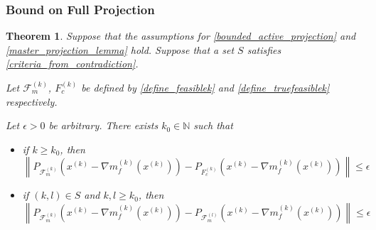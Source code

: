 \documentclass{article}
\newtheorem{theorem}{Theorem}[section]
\theoremstyle{case}
\numberwithin{theorem}{subsection}
\newcommand{\feasiblek}{{\mathcal F_m^{(k)}}}
\newcommand{\feasiblel}{{\mathcal F_m^{(l)}}}
\newcommand{\gk}{{\nabla m_f^{(k)}\left(\xk\right)}}
\newcommand{\naturals}{\mathbb N}
\newcommand{\xk}{x^{(k)}}
\newcommand{\truefeasiblek}{{F_c^{(k)}}}
\begin{document}
\subsubsection{Bound on Full Projection}

\begin{theorem}
\label{bounded_projection_theorem}
Suppose that the assumptions for
\cref{bounded_active_projection} and \cref{master_projection_lemma}
hold.
Suppose that a set $S$ satisfies \cref{criteria_from_contradiction}.

Let $\feasiblek$, $\truefeasiblek$ be defined by \cref{define_feasiblek} and \cref{define_truefeasiblek} respectively.

Let $\epsilon > 0$ be arbitrary.
There exists $k_0 \in \naturals$ such that 
\begin{itemize}
\item if $k \ge k_0$, then
$\left\| P_{\feasiblek}\left(\xk - \gk\right) - P_{\truefeasiblek}\left(\xk - \gk\right) \right\| \le \epsilon$
\item if $(k, l) \in S$ and $k,l \ge k_0$, then
$\left\| P_{\feasiblek}\left(\xk - \gk\right) - P_{\feasiblel}\left(\xk - \gk\right) \right\| \le \epsilon$
\end{itemize}
\end{theorem}
\end{document}
